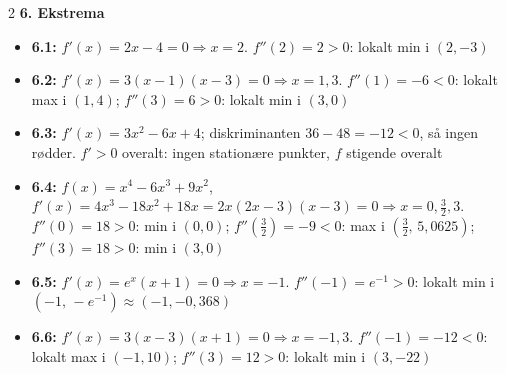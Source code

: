 \documentclass[11pt,a4paper]{article}
\begin{document}
\begin{multicols}{2}
\noindent\textbf{6. Ekstrema}
\begin{itemize}[leftmargin=1.3em, itemsep=1pt, topsep=2pt]
  \item \textbf{6.1:} $f'(x) = 2x-4 = 0 \Rightarrow x = 2$.
        $f''(2) = 2 > 0$: lokalt min i $(2,-3)$
  \item \textbf{6.2:} $f'(x) = 3(x-1)(x-3) = 0 \Rightarrow x = 1, 3$.
        $f''(1) = -6 < 0$: lokalt max i $(1,4)$;
        $f''(3) = 6 > 0$: lokalt min i $(3,0)$
  \item \textbf{6.3:} $f'(x) = 3x^{2}-6x+4$; diskriminanten
        $36 - 48 = -12 < 0$, så ingen rødder. $f' > 0$ overalt:
        ingen stationære punkter, $f$ stigende overalt
  \item \textbf{6.4:} $f(x) = x^{4}-6x^{3}+9x^{2}$,
        $f'(x) = 4x^{3}-18x^{2}+18x = 2x(2x-3)(x-3) = 0
        \Rightarrow x = 0, \tfrac{3}{2}, 3$.
        $f''(0) = 18 > 0$: min i $(0,0)$;
        $f''(\tfrac{3}{2}) = -9 < 0$: max i $(\tfrac{3}{2},\,5{,}0625)$;
        $f''(3) = 18 > 0$: min i $(3,0)$
  \item \textbf{6.5:} $f'(x) = e^{x}(x+1) = 0 \Rightarrow x = -1$.
        $f''(-1) = e^{-1} > 0$: lokalt min i $(-1,\,-e^{-1}) \approx (-1,-0{,}368)$
  \item \textbf{6.6:} $f'(x) = 3(x-3)(x+1) = 0 \Rightarrow x = -1, 3$.
        $f''(-1) = -12 < 0$: lokalt max i $(-1,10)$;
        $f''(3) = 12 > 0$: lokalt min i $(3,-22)$
\end{itemize}


\end{multicols}
\end{document}
